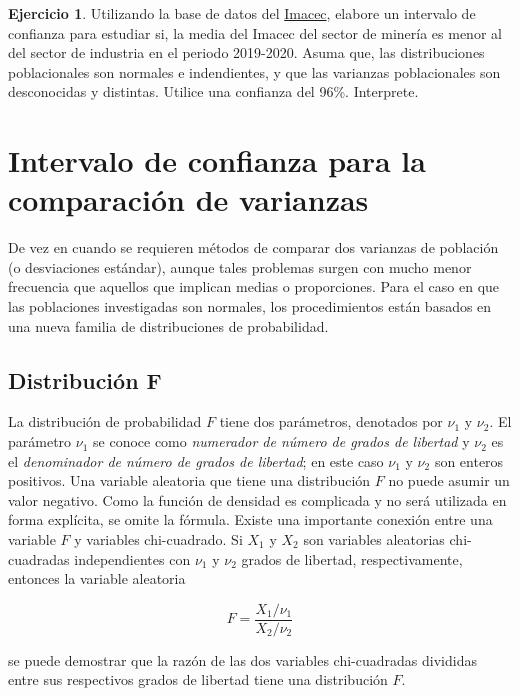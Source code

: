 \documentclass[
  11pt,
]{book}
\theoremstyle{definition}
\theoremstyle{definition}
\theoremstyle{definition}
\newtheorem{exercise}{Ejercicio}[chapter]
\theoremstyle{definition}
\theoremstyle{remark}
\begin{document}
\begin{exercise}
Utilizando la base de datos del \hyperref[Imacec1]{Imacec}, elabore un intervalo de confianza para estudiar si, la media del Imacec del sector de minería es menor al del sector de industria en el periodo 2019-2020. Asuma que, las distribuciones poblacionales son normales e indendientes, y que las varianzas poblacionales son desconocidas y distintas. Utilice una confianza del 96\%. Interprete.
\end{exercise}

\section{Intervalo de confianza para la comparación de varianzas}\label{intervalo-de-confianza-comparacion-de-varianzas}

De vez en cuando se requieren métodos de comparar dos varianzas de población (o desviaciones estándar), aunque tales problemas surgen con mucho menor frecuencia que aquellos que implican medias o proporciones. Para el caso en que las poblaciones investigadas son normales, los procedimientos están basados en una nueva familia de distribuciones de probabilidad.

\subsection*{Distribución F}\label{distribucion-f}

La distribución de probabilidad \(F\) tiene dos parámetros, denotados por \(\nu_{1}\) y \(\nu_{2}\). El parámetro \(\nu_{1}\) se conoce como \textit{numerador de número de grados de libertad} y \(\nu_{2}\) es el \textit{denominador de número de grados de libertad}; en este caso \(\nu_{1}\) y \(\nu_{2}\) son enteros positivos. Una variable aleatoria que tiene una distribución \(F\) no puede asumir un valor negativo. Como la función de densidad es complicada y no será utilizada en forma explícita, se omite la fórmula. Existe una importante conexión entre una variable \(F\) y variables chi-cuadrado. Si \(X_{1}\) y \(X_{2}\) son variables aleatorias chi-cuadradas independientes con \(\nu_{1}\) y \(\nu_{2}\) grados de libertad, respectivamente, entonces la variable aleatoria

\[
F = \frac{X_{1}/\nu_{1}}{X_{2}/\nu_{2}}
\]

se puede demostrar que la razón de las dos variables chi-cuadradas divididas entre sus respectivos grados de libertad tiene una distribución \(F\). \citep[página 360]{Devore}
\end{document}
